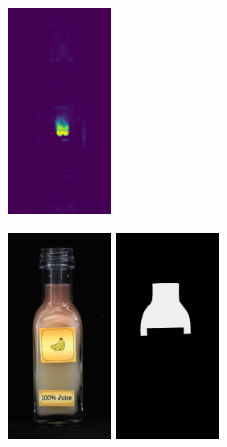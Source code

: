 \begin{figure}[H]
\begin{subfigure}[b]{\textwidth}
\begin{minipage}{0.45\textwidth}
            \includegraphics[width=0.3\textwidth]{figures/appendix/appendix_DRAEM/JB/139_mask.png}
        \end{minipage}
        \begin{minipage}{0.45\textwidth}
            \centering
            \includegraphics[width=0.3\textwidth]{figures/appendix/appendix_DRAEM/JB/280.png}
            \includegraphics[width=0.3\textwidth]{figures/appendix/appendix_DRAEM/JB/280_m.png}

\end{minipage}
\end{subfigure}
\end{figure}
